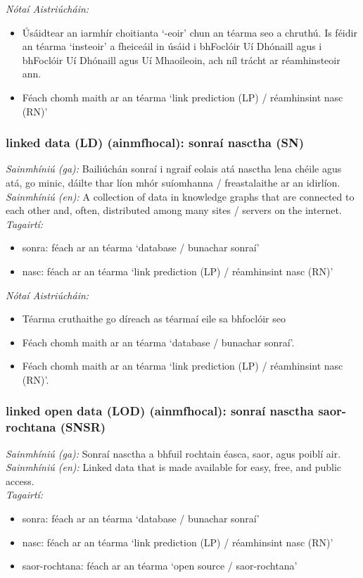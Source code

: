  \noindent \textit{Nótaí Aistriúcháin:}
\begin{itemize}
	\item Úsáidtear an iarmhír choitianta `-eoir' chun an téarma seo a chruthú. Is féidir an téarma `insteoir' a fheiceáil in úsáid i bhFoclóir Uí Dhónaill agus i bhFoclóir Uí Dhónaill agus Uí Mhaoileoin, ach níl trácht ar réamhinsteoir ann.
	\item Féach chomh maith ar an téarma `link prediction (LP) / réamhinsint nasc (RN)'
\end{itemize}


\subsubsection*{linked data (LD) (ainmfhocal): sonraí nasctha (SN)}
 \noindent \textit{Sainmhíniú (ga):} Bailiúchán sonraí i ngraif eolais atá nasctha lena chéile agus atá, go minic, dáilte thar líon mhór suíomhanna / freastalaithe ar an idirlíon.
\\
 \noindent \textit{Sainmhíniú (en):} A collection of data in knowledge graphs that are connected to each other and, often, distributed among many sites / servers on the internet.
\\
 \noindent \textit{Tagairtí:}
\begin{itemize}
	\item sonra: féach ar an téarma `database / bunachar sonraí'
	\item nasc: féach ar an téarma `link prediction (LP) / réamhinsint nasc (RN)'
\end{itemize}

 \noindent \textit{Nótaí Aistriúcháin:}
\begin{itemize}
	\item Téarma cruthaithe go díreach as téarmaí eile sa bhfoclóir seo
	\item Féach chomh maith ar an téarma `database / bunachar sonraí'.
	\item Féach chomh maith ar an téarma `link prediction (LP) / réamhinsint nasc (RN)'.
\end{itemize}


\subsubsection*{linked open data (LOD) (ainmfhocal): sonraí nasctha saor-rochtana (SNSR)}
 \noindent \textit{Sainmhíniú (ga):} Sonraí nasctha a bhfuil rochtain éasca, saor, agus poiblí air.
\\
 \noindent \textit{Sainmhíniú (en):} Linked data that is made available for easy, free, and public access.
\\
 \noindent \textit{Tagairtí:}
\begin{itemize}
	\item sonra: féach ar an téarma `database / bunachar sonraí'
	\item nasc: féach ar an téarma `link prediction (LP) / réamhinsint nasc (RN)'
	\item saor-rochtana: féach ar an téarma `open source / saor-rochtana'
\end{itemize}

